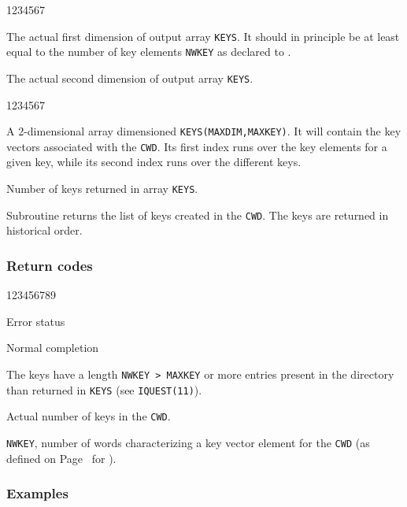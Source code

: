 
\Idesc
\begin{DLtt}{1234567}
\item[MAXDIM]The actual first dimension of output array {\tt KEYS}.
It should in principle be at least equal to the number of key elements
{\tt NWKEY} as declared to .
\item[MAXKEY]The actual second dimension of output array {\tt KEYS}.
\end{DLtt}
\Odesc
\begin{DLtt}{1234567}
\item[KEYS*]A 2-dimensional array dimensioned {\tt KEYS(MAXDIM,MAXKEY)}.
It will contain the key vectors associated with the {\tt CWD}.
Its first index runs over the key elements for a given key, while
its second index runs over the different keys.
\item[NKEYS*]Number of keys returned in array {\tt KEYS}.
\end{DLtt}

Subroutine  returns the list of keys created in the
{\tt CWD}. The keys are returned in historical order.
\subsubsection*{Return codes}
\begin{DLtt}{123456789}
\item[IQUEST(1)]Error status
\begin{DLtt}{1}
\item[0]Normal completion
\item[1]The keys have a length {\tt NWKEY > MAXKEY}
or more entries present in the directory than returned in {\tt KEYS}
(see {\tt IQUEST(11)}).
\end{DLtt}
\par
\item[IQUEST(11)]Actual number of keys in the {\tt CWD}.
\item[IQUEST(12)]{\tt NWKEY}, number of words characterizing a key vector
element for the {\tt CWD} (as defined on Page~\pageref{RZMDIR} for ).
\end{DLtt}

\subsubsection*{Examples}


